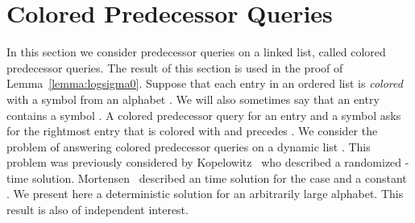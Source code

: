 \documentclass[11pt]{article}\usepackage{fullpage}
\begin{document}



\newpage
\appendix
\renewcommand\thesection{A.\arabic{section}}

\section{Colored Predecessor Queries}
\label{sec:markpred}
In this section we consider predecessor queries on a linked list, called  colored predecessor queries.  The result of this section  is used in the proof of Lemma~\ref{lemma:logsigma0}.
Suppose that each entry in an ordered list  is \emph{colored} with a symbol  from an alphabet . We will also sometimes say that 
an entry  contains a symbol . 
A colored predecessor query  for an entry  and a symbol  asks for the rightmost entry  
that is   colored with  and precedes . We consider the problem of answering colored predecessor queries on a dynamic list . 
This problem was previously considered by Kopelowitz~\cite{Kopelowitz12} who described  a randomized -time solution.
Mortensen~\cite{Mor03} described an  time solution for the case  and a  constant . 
We present here a deterministic solution for an arbitrarily large alphabet. This result is also of independent interest. 
\end{document}
